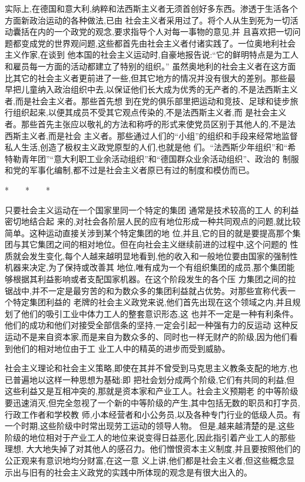 ﻿\documentclass[12pt]{article}
\begin{document}
实际上,在德国和意大利,纳粹和法西斯主义者无须首创好多东西。渗透于生活各个方面新政治运动的各种做法,已由
社会主义者采用过了。将个人从生到死为一切活动囊括在内的一个政党的观念,要求指导个人对每一事物的意见,并
且喜欢把一切问题都变成党的世界观问题,这些都首先由社会主义者付诸实践了。一位奥地利社会主义作家,在谈到
他本国的社会主义运动时,自豪地报告说:``它的鲜明特点是为工人和雇员每一方面的活动都建立了特别的组织。''
虽然奥地利的社会主义者在这方面比其它的社会主义者更前进了一些,但其它地方的情况并没有很大的差别。那些最
早把儿童纳入政治组织中去,以保证他们长大成为优秀的无产者的,不是法西斯主义者,而是社会主义者。那些首先想
到在党的俱乐部里把运动和竞技、足球和徒步旅行组织起来,以便其成员不受其它观点传染的,不是法西斯主义者,而
是社会主义者。那些首先主张应以敬礼的方法和称呼的形式来使党员区别于其他人的,不是法西斯主义者,而是社会
主义者。那些通过人们的``小组''的组织和手段来经常地监督私人生活,创造了极权主义政党原型的人们,也就是他
们。``法西斯少年组织''和``希特勒青年团''``意大利职工业余活动组织''和``德国群众业余活动组织''、政治的
制服和党的军事化编制,都不过是社会主义者原已有过的制度和模仿而已。

*　　*　　*

只要社会主义运动在一个国家里同一个特定的集团 \myrule 通常是技术较高的工人 \myrule 的利益密切地结合起
来的,对社会各阶层人民的应有地位形成一种共同观点的问题,就比较简单。这种运动直接关涉到某个特定集团的地
位,并且,它的目的就是要提高那个集团与其它集团之间的相对地位。但在向社会主义继续前进的过程中,这个问题的
性质就会发生变化,每个人越来越明显地看到,他的收入和一般地位要由国家的强制性机器来决定,为了保持或改善其
地位,唯有成为一个有组织集团的成员,那个集团能够根据其利益影响或者支配国家机器。在这个阶段发生的各个压
力集团之间的拉锯战中,并不一定是最穷苦的和为数众多的集团利益就占优势。对那些宣称代表一个特定集团利益的
老牌的社会主义政党来说,他们首先出现在这个领域之内,并且规划了他们的吸引工业中体力工人的整套意识形态,这
也并不一定是一种有利条件。他们的成功和他们对接受全部信条的坚持,一定会引起一种强有力的反运动 \myrule
这种反运动不是来自资本家,而是来自为数众多的、同时也一样无财产的阶级,因为他们看到他们的相对地位由于工
业工人中的精英的进步而受到威胁。

社会主义理论和社会主义策略,即使在其并不曾受到马克思主义教条支配的地方,也已普遍地以这样一种思想为基础:即
把社会划分成两个阶级,它们有共同的利益,但这些利益又是互相冲突的,那就是资本家和产业工人。社会主义预期老
的中等阶级要迅速消灭,但完全忽视了一个新的中等阶级的产生,其中包括无数的职员和打字员,行政工作者和学校教
师,小本经营者和小公务员,以及各种专门行业的低级人员。有一个时期,这些阶级中时常出现劳工运动的领导人物。
但是,越来越清楚的是,这些阶级的地位相对于产业工人的地位来说变得日益恶化,因此指引着产业工人的那些理想,
大大地失掉了对其他人的感召力。他们憎恨资本主义制度,并且要按照他们的公正观来有意识地均分财富,在这一意
义上讲,他们都是社会主义者,但这些概念显示出与旧有的社会主义政党的实践中所体现的观念是有很大出入的。
\end{document}
